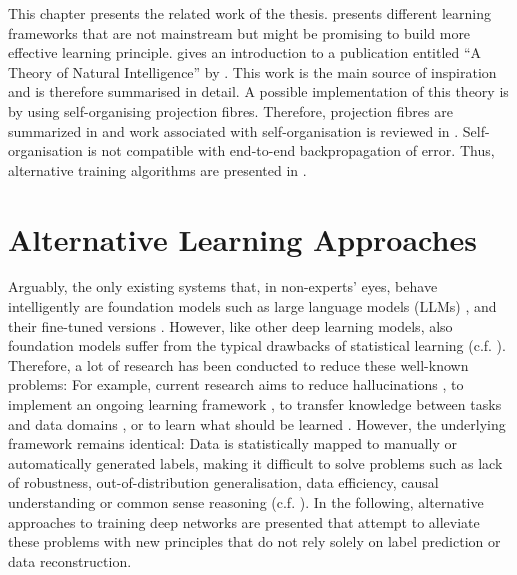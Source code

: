 This chapter presents the related work of the thesis.  presents different learning frameworks that are not mainstream but might be promising to build more effective learning principle.  gives an introduction to a publication entitled ``A Theory of Natural Intelligence'' by . This work is the main source of inspiration and is therefore summarised in detail.
A possible implementation of this theory is by using self-organising projection fibres. Therefore, projection fibres are summarized in  and work associated with self-organisation is reviewed in . Self-organisation is not compatible with end-to-end backpropagation of error. Thus, alternative training algorithms are presented in . %


\section{Alternative Learning Approaches}
Arguably, the only existing systems that, in non-experts' eyes, behave intelligently are foundation models such as large language models (LLMs) \cite{brown_language_2020, touvron_llama_2023}, and their fine-tuned versions \cite{ouyang_training_2022}. However, like other deep learning models, also foundation models suffer from the typical drawbacks of statistical learning (c.f. ). Therefore, a lot of research has been conducted to reduce these well-known problems: For example, current research aims to reduce hallucinations \cite{feldman_trapping_2023, manakul_selfcheckgpt_2023}, to implement an ongoing learning framework \cite{sahoo_online_2018, hoi_online_2021}, to transfer knowledge between tasks and data domains \cite{zhuang_comprehensive_2021, sager_unsupervised_2022}, or to learn what should be learned \cite{thrun_learning_1998, hospedales_meta-learning_2021}. However, the underlying framework remains identical: Data is statistically mapped to manually or automatically generated labels, making it difficult to solve problems such as lack of robustness,  out-of-distribution generalisation, data efficiency, causal understanding or common sense reasoning (c.f. ). In the following, alternative approaches to training deep networks are presented that attempt to alleviate these problems with new principles that do not rely solely on label prediction or data reconstruction. 

